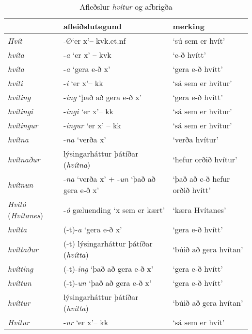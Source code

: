 \documentclass[../samsetningasafn.tex]{subfiles}
\begin{document}
\begin{table}[ht!]%
\begin{footnotesize}
\begin{tcolorbox}
	\begin{center}
	\begin{tabularx}{\textwidth}{lll}
						&	\textbf{afleiðslutegund}					&	\textbf{merking}	\\
	\hline
	\textit{Hvít}			&	-\O \lq er x\rq -- kvk.et.nf					&	\lq sú sem er hvít\rq	\\
	\textit{hvíta}		&	-\textit{a} \lq er x\rq{} -- kvk				&	\lq e-ð hvítt\rq	\\
	\textit{hvíta}		&	-\textit{a} \lq gera e-ð x\rq				&	\lq gera e-ð hvítt\rq		\\
	\textit{hvíti}			&	-\textit{i} \lq er x\rq -- kk					&	\lq sá sem er hvítur\rq	\\
	\textit{hvíting}		&	-\textit{ing} \lq það að gera e-ð x\rq		&	\lq gera e-ð hvítt\rq	\\
	\textit{hvítingi}		&	-\textit{ingi} \lq er x\rq -- kk				&	\lq sá sem er hvítur\rq	\\
	\textit{hvítingur}		&	-\textit{ingur} \lq er x\rq{} -- kk			&	\lq sá sem er hvítur\rq 	\\
	\textit{hvítna}		&	-\textit{na} \lq verða x\rq				&	\lq verða hvítur\rq	\\
	\textit{hvítnaður}	&	lýsingarháttur þátíðar (\textit{hvítna})		&	\lq hefur orðið hvítur\rq	\\
	\textit{hvítnun}		&	-\textit{na} \lq verða x\rq{} + -\textit{un} \lq það að gera e-ð x\rq		&	\lq það að e-ð hefur orðið hvítt\rq	\\
	\textit{Hvító} (\textit{Hvítanes})	&	-\textit{ó} gæluending \lq x sem er kært\rq	&	\lq kæra Hvítanes\rq \\
	\textit{hvítta}		&	(-t)-\textit{a} \lq gera e-ð x\rq			&	\lq gera e-ð hvítt\rq		\\
	\textit{hvíttaður}	&	(-t) lýsingarháttur þátíðar (\textit{hvítta})	&	\lq búið að gera hvítan\rq	\\
	\textit{hvítting}		&	(-t)-\textit{ing} \lq það að gera e-ð x\rq	&	\lq gera e-ð hvítt\rq	\\
	\textit{hvíttun}		&	(-t)-\textit{un} \lq það að gera e-ð x\rq	&	\lq gera e-ð hvítt\rq	\\
	\textit{hvíttur}		&	lýsingarháttur þátíðar (\textit{hvítta})		&	\lq búið að gera hvítan\rq	\\
	\textit{Hvítur}		&	-\textit{ur} \lq er x\rq -- kk				&	\lq sá sem er hvít\rq	\\
	\end{tabularx}
	\end{center}
\end{tcolorbox}
\end{footnotesize}
	\caption{Afleðslur \textit{hvítur} og afbrigða}
	\label{tafla:hvafl}
\end{table}

\clearpage
\end{document}
